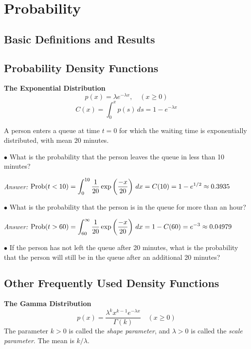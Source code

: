 %
\chapter{Probability}
%
\section{Basic Definitions and Results}
%
\section{Probability Density Functions}
%

\noindent
\textbf{The Exponential Distribution}
\begin{equation}
 p(x) = \lambda e^{-\lambda x}, \quad (x \ge 0)
\end{equation}
\begin{equation}
  C(x) = \int_0^x p(s)\,ds =  1 - e^{-\lambda x}
\end{equation}
\begin{xexample}
A person enters a queue at time $t=0$ for which the
waiting time is exponentially distributed, with mean $20$ minutes.

\noindent
$\bullet$
 What is the probability that the person leaves the
queue in less than 10 minutes?

\noindent
\emph{Answer:} $\displaystyle \textrm{Prob}(t < 10) =\int_0^{10} \frac{1}{20} \exp\left(\frac{-x}{20}\right)\,dx
     = C(10) = 1-e^{1/2} \approx 0.3935$

\noindent
$\bullet$
What is the probability that the person is in the queue for
more than an hour?

\noindent
\emph{Answer:} $\displaystyle \textrm{Prob}(t > 60) = \int_{60}^{\infty} \frac{1}{20} \exp\left(\frac{-x}{20}\right)\,dx
     = 1-C(60) = e^{-3} \approx 0.04979$

\noindent
$\bullet$
If the person has not left the queue after 20 minutes, what is the
probability that the person will still be in the queue after an additional
20 minutes?
\label{ex:exp_example}
\end{xexample}
%
\section{Other Frequently Used Density Functions}
%
\noindent
\textbf{The Gamma Distribution}
\begin{equation}
  p(x) = \frac{\lambda^{k} x^{k-1} e^{-\lambda x}}{\Gamma(k)}
   \quad (x \ge 0)
\end{equation}
The parameter $k>0$ is called the \emph{shape parameter},
and $\lambda > 0$ is called the \emph{scale parameter}.
The mean is $k/\lambda$.

